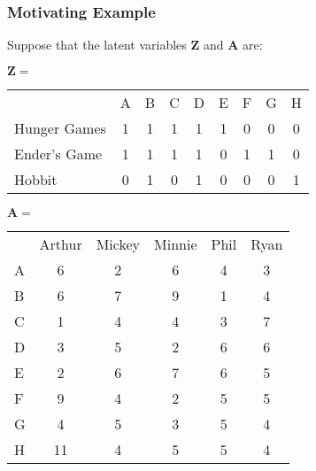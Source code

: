 \documentclass{beamer}
\def\wl{\par \vspace{\baselineskip}}
\begin{document}
  \begin{frame}
  \frametitle{Motivating Example}
      Suppose that the latent variables $\bm Z$ and $\bm A$ are:\\ 
        \wl
        $\bm Z =$
        \begin{tabular}{l|c|c|c|c|c|c|c|c|}
         \multicolumn{1}{c}{}
           & \multicolumn{1}{c}{A} 
           & \multicolumn{1}{c}{B}
           & \multicolumn{1}{c}{C}
           & \multicolumn{1}{c}{D}
           & \multicolumn{1}{c}{E}
           & \multicolumn{1}{c}{F}
           & \multicolumn{1}{c}{G}
           & \multicolumn{1}{c}{H} \\ 
         \cline{2-9}

         Hunger Games &1&1&1&1&1&0&0&0 \\ \cline{2-9}
         Ender's Game &1&1&1&1&0&1&1&0 \\ \cline{2-9}
         Hobbit       &0&1&0&1&0&0&0&1 \\ \cline{2-9}
       \end{tabular}
       \wl
       $\bm A =$
       \begin{tabular}{l|c|c|c|c|c|}
         \multicolumn{1}{c}{}
           & \multicolumn{1}{c}{Arthur} 
           & \multicolumn{1}{c}{Mickey}
           & \multicolumn{1}{c}{Minnie}
           & \multicolumn{1}{c}{Phil}
           & \multicolumn{1}{c}{Ryan} \\ 
         \cline{2-6}

         A & 6&2&6&4&3\\ \cline{2-6}
         B & 6&7&9&1&4\\ \cline{2-6}
         C & 1&4&4&3&7\\ \cline{2-6}
         D & 3&5&2&6&6\\ \cline{2-6}
         E & 2&6&7&6&5\\ \cline{2-6}
         F & 9&4&2&5&5\\ \cline{2-6}
         G & 4&5&3&5&4\\ \cline{2-6}
         H &11&4&5&5&4\\ \cline{2-6}
       \end{tabular}
       
  \end{frame}
\end{document}
